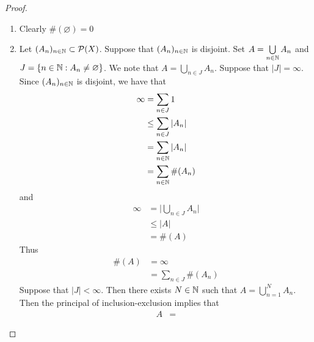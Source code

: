 \documentclass{book}
\begin{document}
	\begin{proof}\
		\begin{enumerate}
			\item Clearly $\#(\varnothing) = 0$
			\item Let $(A_n)_{n \in \mathbb{N}} \subset \mathcal{P}(X)$. Suppose that $(A_n)_{n \in \mathbb{N}}$ is disjoint. Set $A = \bigcup\limits_{n \in \mathbb{N}} A_n$ and $J = \{n \in \mathbb{N}: A_n \neq \varnothing\}$. We note that $A = \bigcup\limits_{n \in J} A_n$. Suppose that $|J| = \infty$. Since $(A_n)_{n \in \mathbb{N}}$ is disjoint, we have that 
			\begin{align*}
				\infty
				& = \sum_{n \in J} 1 \\
				& \leq \sum_{n \in J} |A_n| \\
				& = \sum_{n \in \mathbb{N}} |A_n| \\
				& = \sum_{n \in \mathbb{N}} \#(A_n) 
			\end{align*}
			and 
			\begin{align*}
				\infty
				& = \bigg| \bigcup_{n \in J} A_n \bigg| \\
				& \leq \bigg| A \bigg| \\
				& = \#(A)
			\end{align*}
			Thus 
			\begin{align*}
				\#(A) 
				& = \infty \\
				& = \sum_{n \in J} \#(A_n) 
			\end{align*}
			Suppose that $|J| < \infty$. Then there exists $N \in \mathbb{N}$ such that $A = \bigcup\limits_{n=1}^N A_n$. Then the principal of inclusion-exclusion implies that 
			\begin{align*}
				A
				& = 
			\end{align*}
		\end{enumerate}
	\end{proof}
\end{document}
